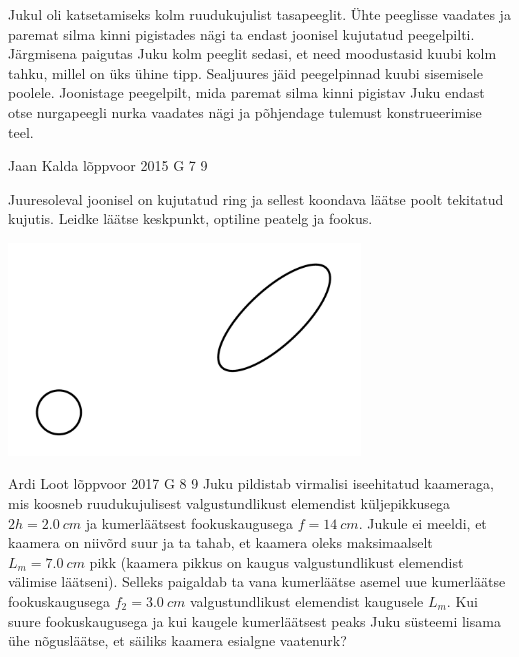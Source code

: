 \documentclass[11pt]{article}
\begin{document}
{{Jukul oli katsetamiseks kolm ruudukujulist tasapeeglit. Ühte peeglisse vaadates ja paremat silma kinni pigistades nägi ta endast joonisel kujutatud peegelpilti. Järgmisena paigutas Juku kolm peeglit sedasi, et need moodustasid kuubi kolm tahku, millel on üks ühine tipp. Sealjuures jäid peegelpinnad kuubi sisemisele poolele. Joonistage peegelpilt, mida paremat silma kinni pigistav Juku endast otse nurgapeegli nurka vaadates nägi ja põhjendage tulemust konstrueerimise teel.
\fi
}

{Jaan Kalda} %
{lõppvoor} %
{2015} %
{G 7} %
{9} %
{
\ifStatement
Juuresoleval joonisel on kujutatud ring ja sellest koondava läätse poolt tekitatud kujutis. Leidke läätse keskpunkt, optiline peatelg ja fookus.
\begin{center}
\includegraphics[width=0.7\textwidth]{2015-v3g-07-ringjaellips}%
\end{center}
\fi
}

{Ardi Loot} %
{lõppvoor} %
{2017} %
{G 8} %
{9} %
{
\ifStatement
Juku pildistab virmalisi iseehitatud kaameraga, mis koosneb ruudukujulisest
valgustundlikust elemendist küljepikkusega $2h=\SI{2.0}{cm}$ ja kumerläätsest
fookuskaugusega $f=\SI{14}{cm}.$ Jukule ei meeldi, et kaamera on
niivõrd suur ja ta tahab, et kaamera oleks maksimaalselt $L_{m}=\SI{7.0}{cm}$
pikk (kaamera pikkus on kaugus valgustundlikust elemendist välimise läätseni).
Selleks paigaldab ta vana kumerläätse asemel uue kumerläätse fookuskaugusega $f_{2}=\SI{3.0}{cm}$
valgustundlikust elemendist kaugusele $L_{m}.$ Kui suure fookuskaugusega
ja kui kaugele kumerläätsest peaks Juku süsteemi
lisama ühe nõgusläätse, et säiliks kaamera esialgne vaatenurk?
\fi
}

}
\end{document}
